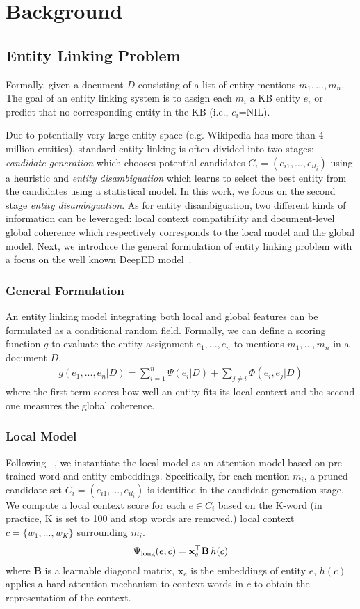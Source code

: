 \documentclass[letterpaper]{article} \usepackage{aaai20}  \usepackage{times}  \usepackage{helvet} \usepackage{courier}  \usepackage[hyphens]{url}  \usepackage{graphicx} \urlstyle{rm} \def\UrlFont{\rm}  \usepackage{graphicx}  \frenchspacing  \setlength{\pdfpagewidth}{8.5in}  \setlength{\pdfpageheight}{11in}  \usepackage{multirow}
\newcommand{\namecite}[1]{\citeauthor{#1}~\shortcite{#1}}
\newcommand{\x}{{\mathbf x}}
\newcommand{\mat}[1]{{\mathbf #1}}
\begin{document}
\section{Background}
\subsection{Entity Linking Problem}
Formally, given a document $D$ consisting of a list of entity mentions $m_1,...,m_n$. The goal of an entity linking system is to assign each $m_i$ a KB entity $e_i$ or predict that no corresponding entity in the KB (i.e., $e_i$=NIL).

Due to potentially very large entity space (e.g. Wikipedia has more than 4 million entities), standard entity linking is often divided into two stages: {\em candidate generation} which chooses potential candidates $C_i=(e_{i1},...,e_{il_i})$ using a heuristic and {\em entity disambiguation} which learns to select the best entity from the candidates using a statistical model. In this work, we focus on the second stage {\em entity disambiguation}. As for entity disambiguation, two different kinds of information can be leveraged: local context compatibility and document-level global coherence which respectively corresponds to the local model and the global model. Next, we introduce the general formulation of entity linking problem with a focus on the well known DeepED model~\cite{ganea2017deep}.

\subsubsection{General Formulation}
An entity linking model integrating both local and global features can be formulated as a conditional random field. Formally, we can define a scoring function $g$ to evaluate the entity assignment $e_1,...,e_n$ to mentions $m_1,...,m_n$ in a document $D$.
\begin{align}
    g(e_1,...,e_n|D)=\sum_{i=1}^{n} \Psi(e_i|D) + \sum_{j\neq{i}} \Phi(e_i,e_j|D)
    \label{eq:general_model}
\end{align}
where the first term scores how well an entity fits its local context and the second one measures the global coherence.

\subsubsection{Local Model}
Following \namecite{ganea2017deep}, we instantiate the local model as an attention model based on pre-trained word and entity embeddings. Specifically, for each mention $m_i$, a pruned candidate set $C_i=(e_{i1},...,e_{il_i})$ is identified in the candidate generation stage. We compute a local context score for each $e \in C_i$ based on the K-word (in practice, K is set to 100 and stop words are removed.) local context $c=\{w_1,...,w_K\}$ surrounding $m_i$. 
\begin{align}
\Psi_{\rm long}(e,c) =  \x_{e}^\top \mat B \, h(c)
\label{eq:psi}
\end{align}
where $\mat B$ is a learnable diagonal matrix, $\x_{e}$ is the embeddings of entity $e$, $h(c)$ applies a hard attention mechanism to context words in $c$ to obtain the representation of the context.
\end{document}
